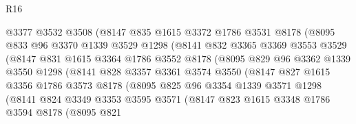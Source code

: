 \begin{lexlean}{R16}
\begin{coremodule}
                    @3377
                    @3532
                    @3508
                    (@8147
                      @835
                      @1615
                      @3372
                      @1786
                      @3531
                      @8178
                      (@8095
                        @833
                        @96
                        @3370
                        @1339
                        @3529
                        @1298
                        (@8141
                          @832
                          @3365
                          @3369
                          @3553
                          @3529
                          (@8147
                            @831
                            @1615
                            @3364
                            @1786
                            @3552
                            @8178
                            (@8095
                              @829
                              @96
                              @3362
                              @1339
                              @3550
                              @1298
                              (@8141
                                @828
                                @3357
                                @3361
                                @3574
                                @3550
                                (@8147
                                  @827
                                  @1615
                                  @3356
                                  @1786
                                  @3573
                                  @8178
                                  (@8095
                                    @825
                                    @96
                                    @3354
                                    @1339
                                    @3571
                                    @1298
                                    (@8141
                                      @824
                                      @3349
                                      @3353
                                      @3595
                                      @3571
                                      (@8147
                                        @823
                                        @1615
                                        @3348
                                        @1786
                                        @3594
                                        @8178
                                        (@8095
                                          @821

\end{coremodule}
\end{lexlean}
